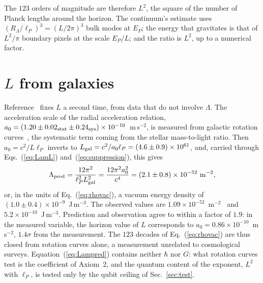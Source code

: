 \documentclass[aps,prd,twocolumn,superscriptaddress,nofootinbib,showkeys]{revtex4-2}
\begin{document}
The $123$ orders of magnitude are therefore $L^2$, the square of the number of Planck lengths around the horizon. The continuum's estimate uses $(R_\Lambda/\ell_P)^3 = (L/2\pi)^3$ bulk modes at $E_P$; the energy that gravitates is that of $L^2/\pi$ boundary pixels at the scale $E_P/L$; and the ratio is $L^2$, up to a numerical factor.

\section{\texorpdfstring{$L$}{L} from galaxies}
\label{sec:galactic}

Reference~\cite{korytko2026} fixes $L$ a second time, from data that do not involve $\Lambda$. The acceleration scale of the radial acceleration relation, $a_0=(1.20\pm0.02_{\rm stat}\pm0.24_{\rm sys})\times10^{-10}$~m\,s$^{-2}$, is measured from galactic rotation curves~\cite{mcgaugh2016}, the systematic term coming from the stellar mass-to-light ratio. Then $a_0=c^2/L\ell_P$ inverts to $L_{\rm gal}=c^2/a_0\ell_P=(4.6\pm0.9)\times10^{61}$, and, carried through Eqs.~(\ref{eq:LamL}) and~(\ref{eq:suppression}), this gives
\begin{equation}
\Lambda_{\rm pred} = \frac{12\pi^2}{\ell_P^2L_{\rm gal}^2} = \frac{12\pi^2a_0^2}{c^4} = (2.1\pm0.8)\times10^{-52}~{\rm m^{-2}},
\label{eq:Lampred}
\end{equation}
or, in the units of Eq.~(\ref{eq:rhovac}), a vacuum energy density of $(1.0\pm0.4)\times10^{-9}$~J\,m$^{-3}$. The observed values are $1.09\times10^{-52}$~m$^{-2}$~\cite{planck2018} and $5.2\times10^{-10}$~J\,m$^{-3}$. Prediction and observation agree to within a factor of $1.9$: in the measured variable, the horizon value of $L$ corresponds to $a_0 = 0.86\times10^{-10}$~m\,s$^{-2}$, $1.4\sigma$ from the measurement. The $123$ decades of Eq.~(\ref{eq:rhovac}) are thus closed from rotation curves alone, a measurement unrelated to cosmological surveys. Equation~(\ref{eq:Lampred}) contains neither $\hbar$ nor $G$: what rotation curves test is the coefficient of Axiom~2, and the quantum content of the exponent, $L^2$ with $\ell_P$, is tested only by the qubit ceiling of Sec.~\ref{sec:test}.
\end{document}
